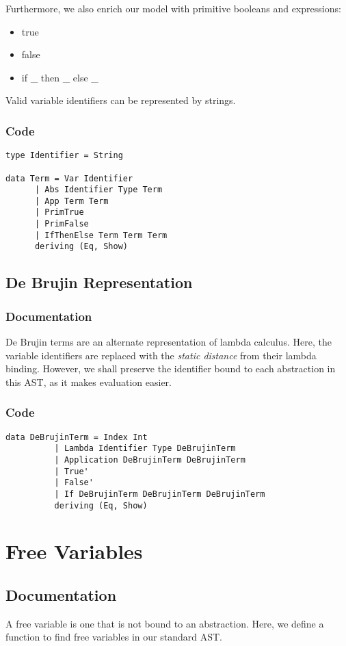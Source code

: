 \documentclass[11pt]{article}
\begin{document}
Furthermore, we also enrich our model with primitive booleans and expressions:
\begin{itemize}
\item true
\item false
\item if \_ then \_ else \_
\end{itemize}

Valid variable identifiers can be represented by strings. 

\subsubsection{Code}
\label{sec-1-2-2}
\begin{verbatim}
type Identifier = String

data Term = Var Identifier
	  | Abs Identifier Type Term
	  | App Term Term
	  | PrimTrue
	  | PrimFalse
	  | IfThenElse Term Term Term
	  deriving (Eq, Show)
\end{verbatim}

\subsection{De Brujin Representation}
\label{sec-1-3}
\subsubsection{Documentation}
\label{sec-1-3-1}
De Brujin terms are an alternate representation of lambda calculus. Here, the variable identifiers are replaced with the \emph{static distance} from their lambda binding. However, we shall preserve the identifier bound to each abstraction in this AST, as it makes evaluation easier.

\subsubsection{Code}
\label{sec-1-3-2}
\begin{verbatim}
data DeBrujinTerm = Index Int 
		  | Lambda Identifier Type DeBrujinTerm
		  | Application DeBrujinTerm DeBrujinTerm
		  | True'
		  | False'
		  | If DeBrujinTerm DeBrujinTerm DeBrujinTerm
		  deriving (Eq, Show)
\end{verbatim}


\section{Free Variables}
\label{sec-2}
\subsection{Documentation}
\label{sec-2-1}
A free variable is one that is not bound to an abstraction. Here, we define a function to find free variables in our standard AST.
\end{document}
